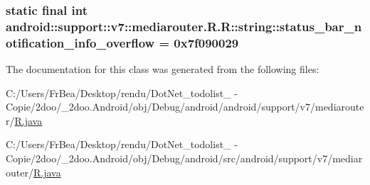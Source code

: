 \hypertarget{classandroid_1_1support_1_1v7_1_1mediarouter_1_1_r_1_1string_a766a9c63fc6630aaec74b553e59284f}{
\subsubsection[{status\_\-bar\_\-notification\_\-info\_\-overflow}]{\setlength{\rightskip}{0pt plus 5cm}static final int android::support::v7::mediarouter.R.R::string::status\_\-bar\_\-notification\_\-info\_\-overflow = 0x7f090029}}
\label{classandroid_1_1support_1_1v7_1_1mediarouter_1_1_r_1_1string_a766a9c63fc6630aaec74b553e59284f}




The documentation for this class was generated from the following files:\begin{CompactItemize}
\item 
C:/Users/FrBea/Desktop/rendu/DotNet\_\-todolist\_ - Copie/2doo/\_\-2doo.Android/obj/Debug/android/android/support/v7/mediarouter/\hyperlink{android_2support_2v7_2mediarouter_2_r_8java}{R.java}\item 
C:/Users/FrBea/Desktop/rendu/DotNet\_\-todolist\_ - Copie/2doo/\_\-2doo.Android/obj/Debug/android/src/android/support/v7/mediarouter/\hyperlink{src_2android_2support_2v7_2mediarouter_2_r_8java}{R.java}\end{CompactItemize}
